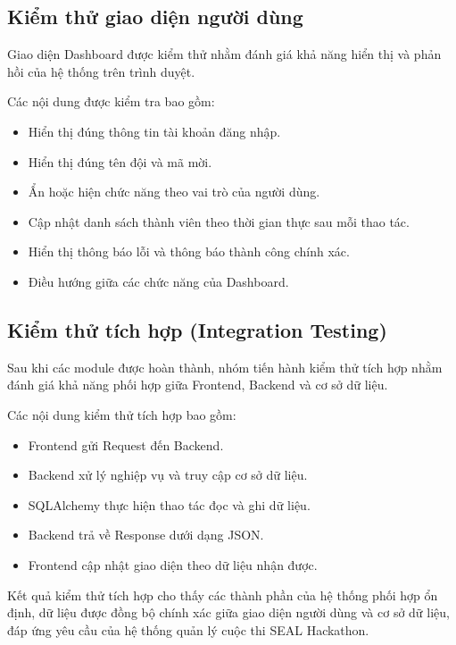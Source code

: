 
\subsection{Kiểm thử giao diện người dùng}

Giao diện Dashboard được kiểm thử nhằm đánh giá khả năng hiển thị và phản hồi của hệ thống trên trình duyệt.

Các nội dung được kiểm tra bao gồm:

\begin{itemize}
	\item Hiển thị đúng thông tin tài khoản đăng nhập.
	\item Hiển thị đúng tên đội và mã mời.
	\item Ẩn hoặc hiện chức năng theo vai trò của người dùng.
	\item Cập nhật danh sách thành viên theo thời gian thực sau mỗi thao tác.
	\item Hiển thị thông báo lỗi và thông báo thành công chính xác.
	\item Điều hướng giữa các chức năng của Dashboard.
\end{itemize}


\subsection{Kiểm thử tích hợp (Integration Testing)}

Sau khi các module được hoàn thành, nhóm tiến hành kiểm thử tích hợp nhằm đánh giá khả năng phối hợp giữa Frontend, Backend và cơ sở dữ liệu.

Các nội dung kiểm thử tích hợp bao gồm:

\begin{itemize}
	\item Frontend gửi Request đến Backend.
	\item Backend xử lý nghiệp vụ và truy cập cơ sở dữ liệu.
	\item SQLAlchemy thực hiện thao tác đọc và ghi dữ liệu.
	\item Backend trả về Response dưới dạng JSON.
	\item Frontend cập nhật giao diện theo dữ liệu nhận được.
\end{itemize}

Kết quả kiểm thử tích hợp cho thấy các thành phần của hệ thống phối hợp ổn định, dữ liệu được đồng bộ chính xác giữa giao diện người dùng và cơ sở dữ liệu, đáp ứng yêu cầu của hệ thống quản lý cuộc thi SEAL Hackathon.

